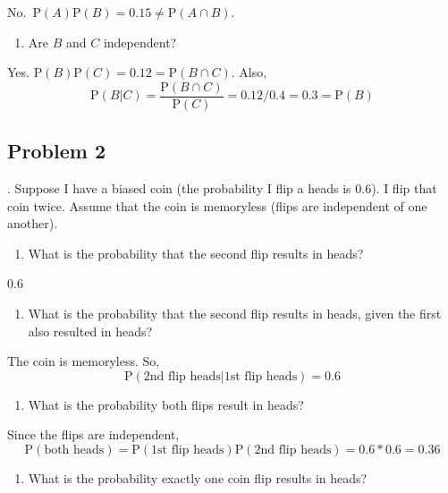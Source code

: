 \documentclass[
]{book}
\providecommand{\tightlist}{%
  \setlength{\itemsep}{0pt}\setlength{\parskip}{0pt}}
\begin{document}
No.~\(\mbox{P}(A)\mbox{P}(B)=0.15\neq \mbox{P}(A\cap B)\).

\begin{enumerate}
\def\labelenumi{\alph{enumi}.}
\setcounter{enumi}{1}
\tightlist
\item
  Are \(B\) and \(C\) independent?
\end{enumerate}

Yes. \(\mbox{P}(B)\mbox{P}(C)=0.12 = \mbox{P}(B\cap C)\). Also,
\[
\mbox{P}(B|C)=\frac{\mbox{P}(B\cap C)}{\mbox{P}(C)}= 0.12/0.4 = 0.3 =\mbox{P}(B)
\]

\hypertarget{problem-2-8}{%
\subsection{Problem 2}\label{problem-2-8}}

. Suppose I have a biased coin (the probability I flip a heads is 0.6). I flip that coin twice. Assume that the coin is memoryless (flips are independent of one another).

\begin{enumerate}
\def\labelenumi{\alph{enumi}.}
\tightlist
\item
  What is the probability that the second flip results in heads?
\end{enumerate}

0.6

\begin{enumerate}
\def\labelenumi{\alph{enumi}.}
\setcounter{enumi}{1}
\tightlist
\item
  What is the probability that the second flip results in heads, given the first also resulted in heads?
\end{enumerate}

The coin is memoryless. So,
\[
\mbox{P}(\mbox{2nd flip heads}|\mbox{1st flip heads}) = 0.6
\]

\begin{enumerate}
\def\labelenumi{\alph{enumi}.}
\setcounter{enumi}{2}
\tightlist
\item
  What is the probability both flips result in heads?
\end{enumerate}

Since the flips are independent,
\[
\mbox{P}(\mbox{both heads})=\mbox{P}(\mbox{1st flip heads})\mbox{P}(\mbox{2nd flip heads}) = 0.6*0.6=0.36
\]

\begin{enumerate}
\def\labelenumi{\alph{enumi}.}
\setcounter{enumi}{3}
\tightlist
\item
  What is the probability exactly one coin flip results in heads?
\end{enumerate}
\end{document}
